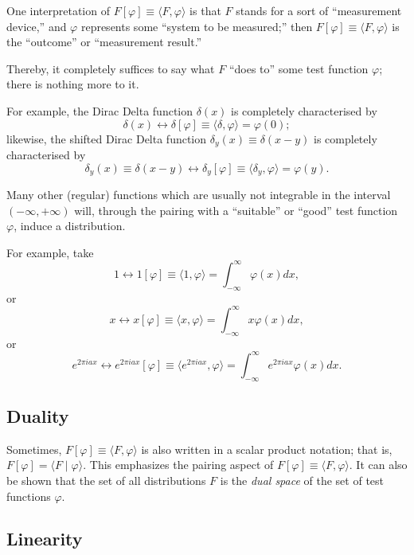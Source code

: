 One interpretation of
$F[\varphi ]\equiv \langle F , \varphi \rangle $
is that  $F$ stands for a sort of ``measurement device,''
and $\varphi$ represents some ``system to be measured;''
then
$F[\varphi ]\equiv \langle F , \varphi \rangle $
is the ``outcome'' or ``measurement result.''

Thereby, it completely suffices to say what $F$ ``does to'' some test function $\varphi$; there is nothing more to it.

{
\color{blue}
\bexample
For example, the Dirac Delta function $\delta(x)$ is completely characterised by
$$\delta(x)  \longleftrightarrow \delta [\varphi ]\equiv \langle \delta , \varphi \rangle =\varphi (0);$$
likewise,
the shifted Dirac Delta function $\delta_y(x)\equiv \delta (x-y)$ is completely characterised by
$$\delta_y (x) \equiv \delta(x-y) \longleftrightarrow \delta_y
[\varphi ]\equiv \langle \delta_y , \varphi \rangle =\varphi (y).$$
\eexample
}

Many other (regular) functions which are usually not integrable in the interval
$( -\infty , +\infty )$ will, through the pairing with a
``suitable'' or ``good'' test function $\varphi$,
induce a distribution.

{
\color{blue}
\bexample
For example, take
$$1 \longleftrightarrow 1 [\varphi ]\equiv \langle 1 , \varphi \rangle
=\int_{-\infty}^\infty
\varphi (x)
dx  , $$
or
$$x \longleftrightarrow x [\varphi ]\equiv \langle x , \varphi \rangle =\int_{-\infty}^\infty
x\varphi (x)
dx,$$
or
$$e^{2\pi i ax} \longleftrightarrow e^{2\pi i ax} [\varphi ]\equiv \langle e^{2\pi i ax}  ,
\varphi \rangle
=\int_{-\infty}^\infty
e^{2\pi i ax} \varphi (x)
dx  .$$
\eexample
}

\subsection{Duality}

Sometimes, $F[\varphi ]\equiv \langle F , \varphi \rangle $   is also written in a scalar product notation; that is,
$F[\varphi] =\langle F \mid \varphi \rangle$.
This emphasizes the pairing aspect of $F[\varphi ]\equiv \langle F , \varphi \rangle $.
It can also be shown that the set of all distributions $F$ is the {\em dual space} of the set of test functions $\varphi$.


\subsection{Linearity}


